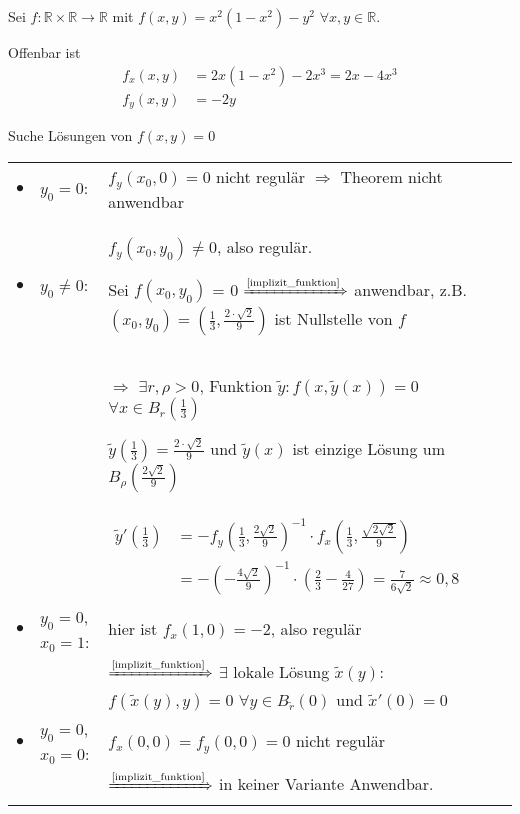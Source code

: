 \begin{example}
	Sei $f:\mathbb{R}\times\mathbb{R}\to\mathbb{R}$ mit $f(x,y) = x^2(1 - x^2) - y^2$ $\forall x,y\in\mathbb{R}$.
	
	Offenbar ist \begin{align*}
		f_x(x,y) &= 2x(1 - x^2) - 2x^3 = 2x - 4x^3 \\
		f_y(x,y) &= -2y
	\end{align*}
	
	Suche Lösungen von $f(x,y) = 0$ \\
	\renewcommand{\arraystretch}{1.5}
	\begin{tabularx}{\linewidth}{c@{\ }l@{$\;\,$}X}
		$\bullet$ & $y_0=0$:& $f_y(x_0, 0) = 0$ nicht regulär $\Rightarrow$ Theorem nicht anwendbar \\
		$\bullet$ & $y_0\neq 0$: & $f_y(x_0, y_0)\neq 0$, also regulär.
		
		Sei $f(x_0, y_0)$ = 0 $\xRightarrow{\text{\cref{implizit_funktion}}}$ anwendbar, z.B. $(x_0, y_0) = (\frac{1}{3}, \frac{2\cdot\sqrt{2}}{9})$ ist Nullstelle von $f$  \\
		&&$\Rightarrow$ $\exists r,\rho > 0$, Funktion $\tilde{y}:f(x,\tilde{y}(x)) = 0$ $\forall x\in B_r(\frac{1}{3})$
		
		$\tilde{y}(\frac{1}{3}) = \frac{2\cdot \sqrt{2}}{9}$ und $\tilde{y}(x)$ ist einzige Lösung um $B_\rho(\frac{2\sqrt{2}}{9})$\\
		
		&& $\begin{aligned}\tilde{y}'\left(\frac{1}{3}\right) &= -f_y\left(\frac{1}{3}, \frac{2\sqrt{2}}{9}\right)^{-1}\cdot f_x\left(\frac{1}{3}, \frac{\sqrt{2\sqrt{2}}}{9}\right) \\
		&= -\left(-\frac{4\sqrt{2}}{9}\right)^{-1}\cdot\left(\frac{2}{3} - \frac{4}{27}\right) = \frac{7}{6\sqrt{2}} \approx 0,8\end{aligned}$ \\
		
		$\bullet$ & $y_0 = 0$, $x_0 = 1$: & hier ist $f_x(1,0) = -2$, also regulär \\
		&& $\xRightarrow{\text{\cref{implizit_funktion}}}$ $\exists$ lokale Lösung $\tilde{x}(y)$: $f(\tilde{x}(y), y) = 0$ $\forall y\in B_{\tilde{r}}(0)$ und $\tilde{x}'(0) = 0$ \\
		
		$\bullet$ & $y_0 = 0$, $x_0 = 0$: & $f_x(0,0) = f_y(0,0) = 0$ nicht regulär\\
		&& $\xRightarrow{\text{\cref{implizit_funktion}}}$ in keiner Variante Anwendbar.
	\end{tabularx}
\end{example}

